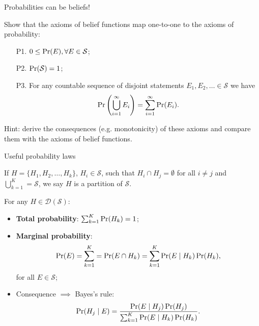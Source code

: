 \begin{frame}{Probabilities can be beliefs!}
 \begin{exercise}
  Show that the axioms of belief functions map one-to-one to the axioms of probability:
  \begin{itemize}
   \item[P1.] $0 \leq \operatorname{Pr}(E), \forall E \in \mathcal{S}$;
   \item[P2.] $\operatorname{Pr}(\mathcal{S}) = 1$;
   \item[P3.] For any countable sequence of disjoint statements $E_1, E_2, \ldots \in \mathcal{S}$ we have
   $$ \operatorname{Pr} \left(\bigcup_{i=1}^\infty E_i \right) = \sum_{i=1}^\infty \operatorname{Pr}(E_i).$$
  \end{itemize}
 \end{exercise}
Hint: derive the consequences (e.g. monotonicity) of these axioms and compare them with the axioms of belief functions.
\end{frame}
\begin{frame}{Useful probability laws}
\begin{defn}[Partition]
 \label{def:partition}
 If $H = \{H_1, H_2, \ldots, H_k\}$, $H_i \in \mathcal{S}$, such that $H_i \cap H_j = \emptyset$  for all $i \neq j$ and $\bigcup_{k=1}^K = \mathcal{S}$, we say $H$ is a partition of $\mathcal{S}$.
\end{defn}
For any $H \in \mathcal{D}(\mathcal{S})$:
 \begin{itemize}
  \item \textbf{Total probability}: $\sum_{k=1}^K \operatorname{Pr}(H_k) = 1$;
  \item \textbf{Marginal probability}: $$\operatorname{Pr}(E) = \sum_{k=1}^K = \operatorname{Pr}(E \cap H_k) =  \sum_{k=1}^K \operatorname{Pr}(E \mid H_k)\operatorname{Pr}(H_k),$$
  for all $E \in \mathcal{S}$;
  \item Consequence $\implies$ Bayes's rule:
$$ \operatorname{Pr}(H_j \mid E) = \frac{\operatorname{Pr}(E \mid H_j)\operatorname{Pr}(H_j)}{\sum_{k=1}^K \operatorname{Pr}(E \mid H_k)\operatorname{Pr}(H_k)}.$$
  \end{itemize}
\end{frame}
